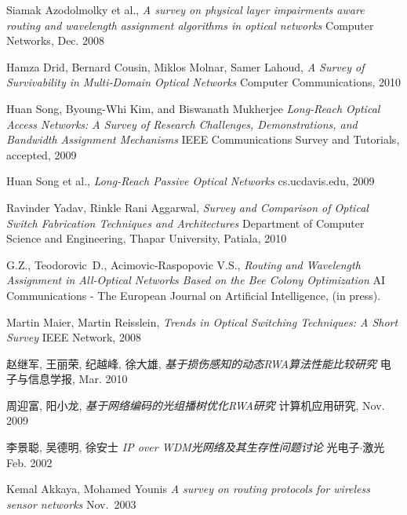\documentclass[11pt,twocolumn]{ctexart}
\begin{document}
{}
\begin{thebibliography}{99}
 Siamak Azodolmolky et al.,
	{\it A survey on physical layer impairments aware routing and wavelength assignment algorithms in optical networks}
	Computer Networks, Dec. 2008
	
 Hamza Drid, Bernard Cousin, Miklos Molnar, Samer Lahoud,
	{\it A Survey of Survivability in Multi-Domain Optical Networks}
	Computer Communications, 2010 
	
 Huan Song, Byoung-Whi Kim, and Biswanath Mukherjee 
	{\it Long-Reach Optical Access Networks: A Survey of Research Challenges, Demonstrations, and Bandwidth Assignment Mechanisms}
	 IEEE Communications Survey and Tutorials, accepted, 2009

 Huan Song et al.,
	{\it Long-Reach Passive Optical Networks}
	cs.ucdavis.edu, 2009
	
 Ravinder Yadav, Rinkle Rani Aggarwal,
	{\it Survey and Comparison of Optical Switch Fabrication Techniques and Architectures}
	Department of Computer Science and Engineering, Thapar University, Patiala, 2010
	
 G.Z., Teodorovic~D., Acimovic-Raspopovic V.S.,
	{\it Routing and Wavelength Assignment in All-Optical Networks Based on the Bee Colony Optimization}
	AI Communications - The European Journal on Artificial Intelligence, (in press).
	 
 Martin Maier, Martin Reisslein,
	{\it Trends in Optical Switching Techniques: A Short Survey}
	IEEE Network, 2008

 赵继军, 王丽荣, 纪越峰, 徐大雄,
	{\it 基于损伤感知的动态RWA算法性能比较研究}
	电子与信息学报, Mar. 2010

 周迎富, 阳小龙,
	{\it 基于网络编码的光组播树优化RWA研究}
	计算机应用研究, Nov. 2009

 李景聪, 吴德明, 徐安士
	{\it IP over WDM光网络及其生存性问题讨论}
	光电子$\cdot$激光 Feb. 2002
	
 Kemal Akkaya, Mohamed Younis 
	{\it A survey on routing protocols for wireless sensor networks}
	Nov.~2003
	
\end{thebibliography}
\end{document}
